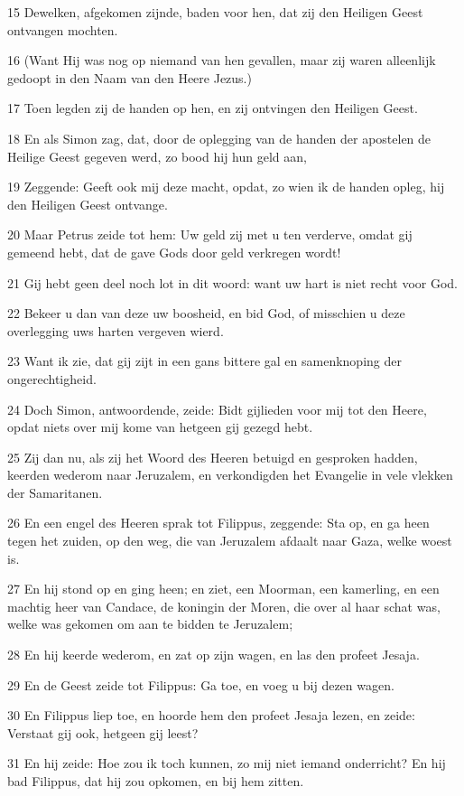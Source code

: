 \par 15 Dewelken, afgekomen zijnde, baden voor hen, dat zij den Heiligen Geest ontvangen mochten.
\par 16 (Want Hij was nog op niemand van hen gevallen, maar zij waren alleenlijk gedoopt in den Naam van den Heere Jezus.)
\par 17 Toen legden zij de handen op hen, en zij ontvingen den Heiligen Geest.
\par 18 En als Simon zag, dat, door de oplegging van de handen der apostelen de Heilige Geest gegeven werd, zo bood hij hun geld aan,
\par 19 Zeggende: Geeft ook mij deze macht, opdat, zo wien ik de handen opleg, hij den Heiligen Geest ontvange.
\par 20 Maar Petrus zeide tot hem: Uw geld zij met u ten verderve, omdat gij gemeend hebt, dat de gave Gods door geld verkregen wordt!
\par 21 Gij hebt geen deel noch lot in dit woord: want uw hart is niet recht voor God.
\par 22 Bekeer u dan van deze uw boosheid, en bid God, of misschien u deze overlegging uws harten vergeven wierd.
\par 23 Want ik zie, dat gij zijt in een gans bittere gal en samenknoping der ongerechtigheid.
\par 24 Doch Simon, antwoordende, zeide: Bidt gijlieden voor mij tot den Heere, opdat niets over mij kome van hetgeen gij gezegd hebt.
\par 25 Zij dan nu, als zij het Woord des Heeren betuigd en gesproken hadden, keerden wederom naar Jeruzalem, en verkondigden het Evangelie in vele vlekken der Samaritanen.
\par 26 En een engel des Heeren sprak tot Filippus, zeggende: Sta op, en ga heen tegen het zuiden, op den weg, die van Jeruzalem afdaalt naar Gaza, welke woest is.
\par 27 En hij stond op en ging heen; en ziet, een Moorman, een kamerling, en een machtig heer van Candace, de koningin der Moren, die over al haar schat was, welke was gekomen om aan te bidden te Jeruzalem;
\par 28 En hij keerde wederom, en zat op zijn wagen, en las den profeet Jesaja.
\par 29 En de Geest zeide tot Filippus: Ga toe, en voeg u bij dezen wagen.
\par 30 En Filippus liep toe, en hoorde hem den profeet Jesaja lezen, en zeide: Verstaat gij ook, hetgeen gij leest?
\par 31 En hij zeide: Hoe zou ik toch kunnen, zo mij niet iemand onderricht? En hij bad Filippus, dat hij zou opkomen, en bij hem zitten.
